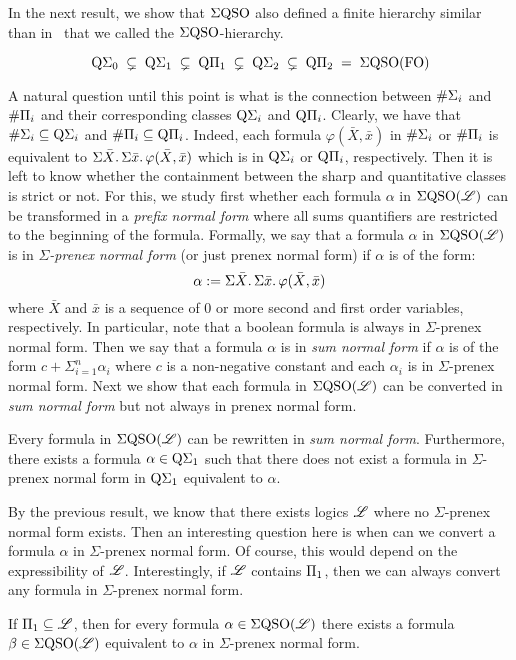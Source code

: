 In the next result, we show that $\Sigma{\rm QSO}$ also defined a finite hierarchy similar than in~\cite{SalujaST95} that we called the $\Sigma{\rm QSO}$-hierarchy.
\begin{proposition} \label{prop:eqso-hierarchy-proper}
\[
\operatorname{Q}\!\Sigma_{0} \; \subsetneq \; \operatorname{Q}\!\Sigma_{1} \; \subsetneq \; \operatorname{Q}\!\Pi_{1} \; \subsetneq \; \operatorname{Q}\!\Sigma_{2} \; \subsetneq \; \operatorname{Q}\!\Pi_{2} \; = \; \Sigma{\rm QSO}({\rm FO})
\]
\end{proposition}
A natural question until this point is what is the connection between $\#\Sigma_{i}$ and $\#\Pi_{i}$ and their corresponding classes $\operatorname{Q}\!\Sigma_{i}$ and $\operatorname{Q}\!\Pi_{i}$. Clearly, we have that $\#\Sigma_{i} \subseteq \operatorname{Q}\!\Sigma_{i}$ and $\#\Pi_{i} \subseteq \operatorname{Q}\!\Pi_{i}$. Indeed, each formula $\varphi(\bar{X}, \bar{x})$ in $\#\Sigma_{i}$ or $\#\Pi_{i}$ is equivalent to $\Sigma{\bar X}.\, \Sigma{\bar x}.\, \varphi(\bar{X}, \bar{x})$ which is in $\operatorname{Q}\!\Sigma_{i}$ or $\operatorname{Q}\!\Pi_{i}$, respectively. 
Then it is left to know whether the containment between the sharp and quantitative classes is strict or not. 
For this, we study first whether each formula $\alpha$ in $\Sigma{\rm QSO}(\mathscr{L})$ can be transformed in a \emph{prefix normal form} where all sums quantifiers are restricted to the beginning of the formula. 
Formally, we say that a formula $\alpha$ in $\Sigma{\rm QSO}(\mathscr{L})$ is in \emph{$\Sigma$-prenex normal form} (or just prenex normal form) if $\alpha$ is of the form:
\[
\alpha := \Sigma{\bar{X}}.\, \Sigma{\bar{x}}.\, \varphi(\bar{X}, \bar{x})
\]
where $\bar{X}$ and $\bar{x}$ is a sequence of $0$ or more second and first order variables, respectively.
In particular, note that a boolean formula is always in $\Sigma$-prenex normal form.
Then we say that a formula $\alpha$ is in \emph{sum normal form} if $\alpha$ is of the form $c + \Sigma_{i=1}^n \alpha_i$ where $c$ is a non-negative constant and each $\alpha_i$ is in $\Sigma$-prenex normal form.
Next we show that each formula in $\Sigma{\rm QSO}(\mathscr{L})$ can be converted in \emph{sum normal form} but not always in prenex normal form.
\begin{theorem} \label{theo:eqso-sum-normal-form}
	Every formula in $\Sigma{\rm QSO}(\mathscr{L})$ can be rewritten in \emph{sum normal form}. Furthermore, there exists a formula $\alpha \in \operatorname{Q}\!\Sigma_{1}$ such that there does not exist a formula in $\Sigma$-prenex normal form in $\operatorname{Q}\!\Sigma_{1}$ equivalent to $\alpha$.
\end{theorem}

By the previous result, we know that there exists logics $\mathscr{L}$ where no $\Sigma$-prenex normal form exists. 
Then an interesting question here is when can we convert a formula $\alpha$ in $\Sigma$-prenex normal form. 
Of course, this would depend on the expressibility of $\mathscr{L}$.
Interestingly, if $\mathscr{L}$ contains $\Pi_{1}$, then we can always convert any formula in $\Sigma$-prenex normal form. 
\begin{theorem} \label{theo:prenex}
	If $\Pi_{1} \subseteq \mathscr{L}$, then for every formula $\alpha \in \Sigma{\rm QSO}(\mathscr{L})$ there exists a formula $\beta \in \Sigma{\rm QSO}(\mathscr{L})$ equivalent to $\alpha$ in $\Sigma$-prenex normal form.
\end{theorem}

